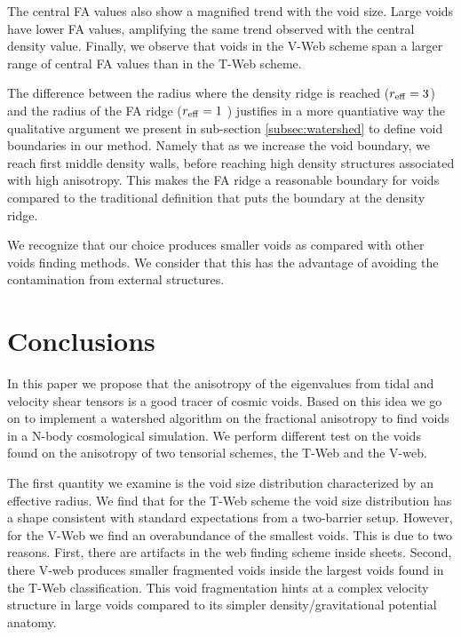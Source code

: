 \documentclass[a4,useAMS,usenatbib,usegraphicx]{mn2e}
\begin{document}
The central FA values also show a magnified trend with the void size. 
Large voids have lower FA values, amplifying the same trend
observed with the central density value. 
Finally, we observe that voids in the V-Web scheme span a larger range
of central FA values than in the T-Web scheme.  

The difference between the radius where the density ridge is reached 
($r_{\rm eff}=3$) and the radius of the FA  ridge ($r_{\rm eff}=1$ )
justifies in a more quantiative way the qualitative argument
we present in sub-section \ref{subsec:watershed} to define void boundaries in
our method.  
Namely that as we increase the void boundary, we reach
first middle density walls, before reaching high density structures
associated with high anisotropy. 
This makes the FA ridge a reasonable
boundary for voids compared to the traditional definition that puts
the boundary at the density ridge.  

We recognize that our choice produces smaller voids as compared with
other voids finding methods. 
We consider that this has the advantage of
avoiding the contamination from external structures.


\section{Conclusions}
\label{sec:conclusions}

In this paper we propose that the anisotropy of the eigenvalues from
tidal and velocity shear tensors is a good tracer of  cosmic voids. 
Based on this idea we go on to implement a watershed
algorithm on the fractional anisotropy to find voids in a N-body
cosmological simulation.
We perform different test on the voids found on the anisotropy of two
tensorial schemes, the T-Web and the V-web.  

The first quantity we examine is the void size distribution
characterized by an effective radius. 
We find that for the T-Web scheme the void size distribution has a
shape consistent with standard expectations from a two-barrier setup. 
However, for the V-Web we find an overabundance of the smallest voids.
This is due to two reasons. 
First, there are artifacts in the web
finding scheme inside sheets. 
Second, there V-web produces smaller
fragmented voids inside the largest voids found in the T-Web
classification.  
This void fragmentation hints at a complex velocity structure in large
voids compared to its simpler density/gravitational potential anatomy.  
\end{document}
